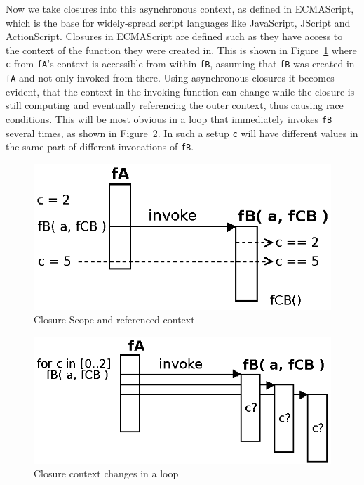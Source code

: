 Now we take closures into this asynchronous context, as defined in ECMAScript\cite{EcmaScript}, which is the base for widely-spread script languages like JavaScript, JScript and ActionScript.
Closures in ECMAScript\cite{EcmaScript} are defined such as they have access to the context of the function they were created in.
This is shown in Figure~\ref{fig:Closures_Closure-1} where \texttt{c} from \texttt{fA}'s context is accessible from within \texttt{fB}, assuming that \texttt{fB} was created in \texttt{fA} and not only invoked from there.
Using asynchronous closures it becomes evident, that the context in the invoking function can change while the closure is still computing and eventually referencing the outer context, thus causing race conditions.
This will be most obvious in a loop that immediately invokes \texttt{fB} several times, as shown in Figure~\ref{fig:Closures_Closure-2}.
In such a setup \texttt{c} will have different values in the same part of different invocations of \texttt{fB}.
\begin{figure}[!ht]
	\centering
  \includegraphics{figures/Closures_Closure-1}
	\caption{Closure Scope and referenced context}
	\label{fig:Closures_Closure-1}
\end{figure}
\begin{figure}[!ht]
	\centering
  \includegraphics{figures/Closures_Closure-2}
	\caption{Closure context changes in a loop}
	\label{fig:Closures_Closure-2}
\end{figure}


